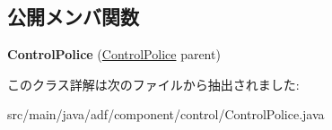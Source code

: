 \subsection*{公開メンバ関数}
\begin{DoxyCompactItemize}
\item 
\hypertarget{classadf_1_1component_1_1control_1_1ControlPolice_a5f749280b92a7b6785bf6207f91834f8}{}\label{classadf_1_1component_1_1control_1_1ControlPolice_a5f749280b92a7b6785bf6207f91834f8} 
{\bfseries Control\+Police} (\hyperlink{classadf_1_1component_1_1control_1_1ControlPolice}{Control\+Police} parent)
\end{DoxyCompactItemize}


このクラス詳解は次のファイルから抽出されました\+:\begin{DoxyCompactItemize}
\item 
src/main/java/adf/component/control/Control\+Police.\+java\end{DoxyCompactItemize}
